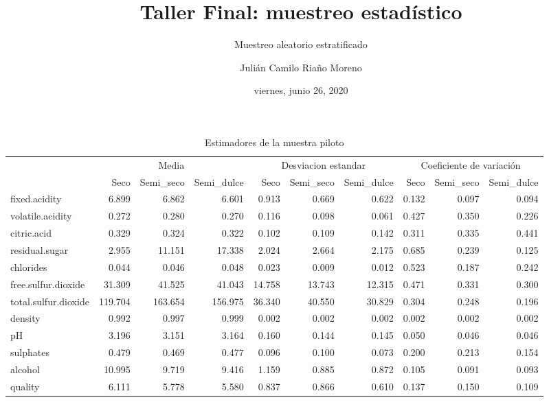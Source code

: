 \documentclass[
]{article}
\title{Taller Final: muestreo estadístico}
\subtitle{Muestreo aleatorio estratificado}
\author{Julián Camilo Riaño Moreno}
\date{viernes, junio 26, 2020}
\begin{document}
\maketitle

{
\setcounter{tocdepth}{2}
\tableofcontents
}
\begin{table}[!h]

\caption{\label{tab:gráfica prueba}Estimadores de la muestra piloto}
\centering
\fontsize{7}{9}\selectfont
\begin{tabular}[t]{lrrrrrrrrr}
\toprule
\multicolumn{1}{c}{} & \multicolumn{3}{c}{Media} & \multicolumn{3}{c}{Desviacion estandar} & \multicolumn{3}{c}{Coeficiente de variación} \\
\cmidrule(l{3pt}r{3pt}){2-4} \cmidrule(l{3pt}r{3pt}){5-7} \cmidrule(l{3pt}r{3pt}){8-10}
  & Seco & Semi\_seco & Semi\_dulce & Seco & Semi\_seco & Semi\_dulce & Seco & Semi\_seco & Semi\_dulce\\
\midrule
\rowcolor{gray!6}  fixed.acidity & 6.899 & 6.862 & 6.601 & 0.913 & 0.669 & 0.622 & 0.132 & 0.097 & 0.094\\
volatile.acidity & 0.272 & 0.280 & 0.270 & 0.116 & 0.098 & 0.061 & 0.427 & 0.350 & 0.226\\
\rowcolor{gray!6}  citric.acid & 0.329 & 0.324 & 0.322 & 0.102 & 0.109 & 0.142 & 0.311 & 0.335 & 0.441\\
residual.sugar & 2.955 & 11.151 & 17.338 & 2.024 & 2.664 & 2.175 & 0.685 & 0.239 & 0.125\\
\rowcolor{gray!6}  chlorides & 0.044 & 0.046 & 0.048 & 0.023 & 0.009 & 0.012 & 0.523 & 0.187 & 0.242\\
\addlinespace
free.sulfur.dioxide & 31.309 & 41.525 & 41.043 & 14.758 & 13.743 & 12.315 & 0.471 & 0.331 & 0.300\\
\rowcolor{gray!6}  total.sulfur.dioxide & 119.704 & 163.654 & 156.975 & 36.340 & 40.550 & 30.829 & 0.304 & 0.248 & 0.196\\
density & 0.992 & 0.997 & 0.999 & 0.002 & 0.002 & 0.002 & 0.002 & 0.002 & 0.002\\
\rowcolor{gray!6}  pH & 3.196 & 3.151 & 3.164 & 0.160 & 0.144 & 0.145 & 0.050 & 0.046 & 0.046\\
sulphates & 0.479 & 0.469 & 0.477 & 0.096 & 0.100 & 0.073 & 0.200 & 0.213 & 0.154\\
\addlinespace
\rowcolor{gray!6}  alcohol & 10.995 & 9.719 & 9.416 & 1.159 & 0.885 & 0.872 & 0.105 & 0.091 & 0.093\\
quality & 6.111 & 5.778 & 5.580 & 0.837 & 0.866 & 0.610 & 0.137 & 0.150 & 0.109\\

\end{tabular}
\end{table}
\end{document}

